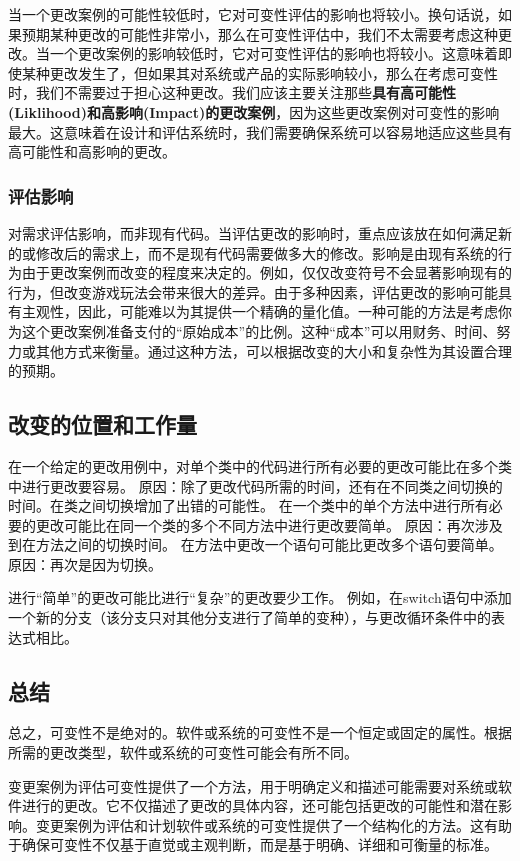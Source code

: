 当一个更改案例的可能性较低时，它对可变性评估的影响也将较小。换句话说，如果预期某种更改的可能性非常小，那么在可变性评估中，我们不太需要考虑这种更改。当一个更改案例的影响较低时，它对可变性评估的影响也将较小。这意味着即使某种更改发生了，但如果其对系统或产品的实际影响较小，那么在考虑可变性时，我们不需要过于担心这种更改。我们应该主要关注那些\textbf{具有高可能性(Liklihood)和高影响(Impact)的更改案例}，因为这些更改案例对可变性的影响最大。这意味着在设计和评估系统时，我们需要确保系统可以容易地适应这些具有高可能性和高影响的更改。

\subsubsection{评估影响}
对需求评估影响，而非现有代码。当评估更改的影响时，重点应该放在如何满足新的或修改后的需求上，而不是现有代码需要做多大的修改。影响是由现有系统的行为由于更改案例而改变的程度来决定的。例如，仅仅改变符号不会显著影响现有的行为，但改变游戏玩法会带来很大的差异。由于多种因素，评估更改的影响可能具有主观性，因此，可能难以为其提供一个精确的量化值。一种可能的方法是考虑你为这个更改案例准备支付的“原始成本”的比例。这种“成本”可以用财务、时间、努力或其他方式来衡量。通过这种方法，可以根据改变的大小和复杂性为其设置合理的预期。

\subsection{改变的位置和工作量}
在一个给定的更改用例中，对单个类中的代码进行所有必要的更改可能比在多个类中进行更改要容易。
原因：除了更改代码所需的时间，还有在不同类之间切换的时间。在类之间切换增加了出错的可能性。
在一个类中的单个方法中进行所有必要的更改可能比在同一个类的多个不同方法中进行更改要简单。
原因：再次涉及到在方法之间的切换时间。
在方法中更改一个语句可能比更改多个语句要简单。
原因：再次是因为切换。

进行“简单”的更改可能比进行“复杂”的更改要少工作。
例如，在switch语句中添加一个新的分支（该分支只对其他分支进行了简单的变种），与更改循环条件中的表达式相比。

\subsection{总结}
总之，可变性不是绝对的。软件或系统的可变性不是一个恒定或固定的属性。根据所需的更改类型，软件或系统的可变性可能会有所不同。

变更案例为评估可变性提供了一个方法，用于明确定义和描述可能需要对系统或软件进行的更改。它不仅描述了更改的具体内容，还可能包括更改的可能性和潜在影响。变更案例为评估和计划软件或系统的可变性提供了一个结构化的方法。这有助于确保可变性不仅基于直觉或主观判断，而是基于明确、详细和可衡量的标准。

